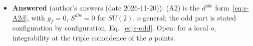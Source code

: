 {\begin{itemize}
\item[(5)] \textbf{Answered} (author's answers (date 2026-11-20)): (A2) is the $d^{abc}$ form~\eqref{eq:s-A2d}, with $g_{f}=0$, $S^{abc}=0$ for $SU(2)$, $o$ general; the odd part is stated configuration by configuration, Eq.~\eqref{eq:s-odd}. Open: for a local $o$, integrability at the triple coincidence of the $\rho$ points.
\end{itemize}

}\par
